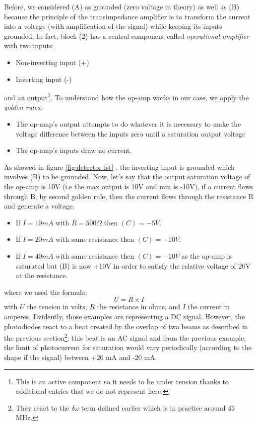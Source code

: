 \documentclass[11pt]{report}
\begin{document}
Before, we considered (A) as grounded (zero voltage in theory) as well as (B) because the principle of the transimpedance amplifier is to transform the current into a voltage (with amplification of the signal) while keeping its inputs grounded. In fact, block (2) has a central component called \textit{operational amplifier} with two inputs:
\begin{itemize}
 \item Non-inverting input (+)
 \item Inverting input (-)
\end{itemize}
and an output\footnote{This is an active component so it needs to be under tension thanks to additional entries that we do not represent here.}. To understand how the op-amp works in our case, we apply the \textit{golden rules}:
\begin{itemize}
 \item The op-amp's output attempts to do whatever it is necessary to make the voltage difference between the inputs zero until a saturation output voltage
 \item The op-amp's inputs draw no current.
\end{itemize} As showed in figure \ref{fig:detector-fst} , the inverting input is grounded which involves (B) to be grounded. Now, let's say that the output saturation voltage of the op-amp is 10V (i.e the max output is 10V and min is -10V), if a current flows through B, by second golden rule, then the current flows through the resistance R and generate a voltage.
\begin{itemize}
	\item If $I = 10mA$ with $R = 500\Omega$ then $(C) = -5V$.
	\item If $I = 20mA$ with same resistance then $(C) = -10V$.
	\item If $I = 40mA$ with same resistance then $(C) = -10V$ as the op-amp is saturated but (B) is now +10V in order to satisfy the relative voltage of 20V at the resistance.
\end{itemize}
where we used the formula:
\begin{equation}
\label{ueqri}
U = R \times I
\end{equation}
with $U$ the tension in volts, $R$ the resistance in ohms, and $I$ the current in amperes. Evidently, those examples are representing a DC signal. However, the photodiodes react to a beat created by the overlap of two beams as described in the previous section\footnote{They react to the $\delta\omega$ term defined earlier which is in practice around 43 MHz.}: this beat is an AC signal and from the previous example, the limit of photocurrent for saturation would vary periodically (according to the shape if the signal) between +20 mA and -20 mA.
\end{document}
